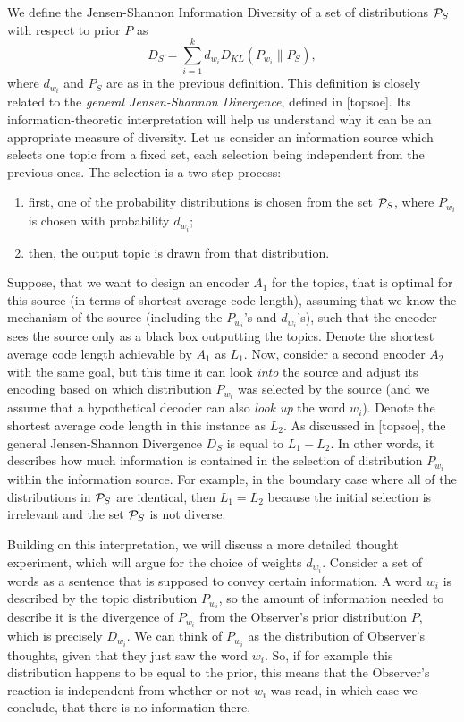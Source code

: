 \bed\label{diversity}
We define the Jensen-Shannon Information Diversity of a set of
distributions ${\mathcal P}_S$ with respect to 
prior $P$ as
\[D_S=\sum_{i=1}^k d_{w_i}D_{KL}(P_{w_i}\|P_S), \]
where $d_{w_i}$ and $P_S$ are as in the previous definition.
\eed
This definition is closely related to the {\em general Jensen-Shannon
  Divergence}, defined in [topsoe]. Its information-theoretic interpretation
will help us understand why it can be an appropriate measure of
diversity. Let us consider an information source which selects one
topic from a fixed set, each selection being independent from the
previous ones. The selection is a two-step process:
\begin{enumerate}
\item first, one of the probability distributions is chosen from
  the set ${\mathcal P}_S$, where $P_{w_i}$ is chosen with probability
  $d_{w_i}$;
\item then, the output topic is drawn from that distribution.
\end{enumerate}
Suppose, that we want to design an encoder $A_1$ for the topics, that is optimal
for this source (in terms of shortest average code length), assuming
that we know the mechanism of the source (including the $P_{w_i}$'s
and $d_{w_i}$'s), such that the encoder sees the source only as a black box
outputting the topics. Denote the shortest average code length achievable
by $A_1$ as $L_1$. Now, consider a second encoder $A_2$ with the same
goal, but this time it can look {\em into} the source and adjust its
encoding based on which distribution $P_{w_i}$ was selected by the
source (and we assume that a hypothetical decoder can also {\em
  look up} the word $w_i$). Denote the shortest average code length in this instance as
$L_2$. As discussed in [topsoe], the general Jensen-Shannon Divergence
$D_S$ is equal to $L_1-L_2$. In other words, it describes how much
information is contained in the selection of distribution $P_{w_i}$
within the information source. For example, in the boundary case where
all of the distributions in ${\mathcal P}_S$ are identical, then $L_1=L_2$
because the initial selection is irrelevant and the set ${\mathcal P}_S$ is not
diverse.  

Building on this interpretation, we will discuss a more detailed
thought experiment, which will argue for the choice of weights
$d_{w_i}$. Consider a set of words as a sentence that is supposed to
convey certain information. A word $w_i$ is described by the topic
distribution $P_{w_i}$, so the amount of information needed to
describe it is the divergence of $P_{w_i}$ from the Observer's prior
distribution $P$, which is precisely $D_{w_i}$. We can think of
$P_{w_i}$ as the distribution of Observer's thoughts, given that they
just saw the word $w_i$. So, if for example this distribution happens
to be equal to the prior, this means that the Observer's reaction is
independent from whether or not $w_i$ was read, in which case we
conclude, that there is no information there. 

